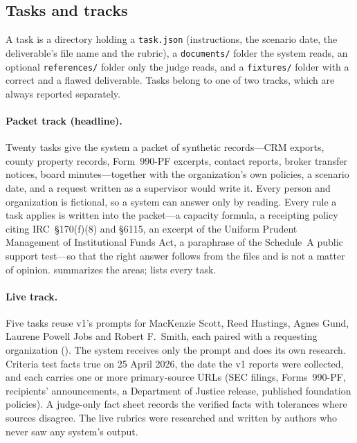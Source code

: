 \documentclass[11pt,a4paper]{article}
\begin{document}
\subsection{Tasks and tracks}

A task is a directory holding a \texttt{task.json} (instructions, the scenario date, the deliverable's file name and the rubric), a \texttt{documents/} folder the system reads, an optional \texttt{references/} folder only the judge reads, and a \texttt{fixtures/} folder with a correct and a flawed deliverable. Tasks belong to one of two tracks, which are always reported separately.

\paragraph{Packet track (headline).} Twenty tasks give the system a packet of synthetic records---CRM exports, county property records, Form~990-PF excerpts, contact reports, broker transfer notices, board minutes---together with the organization's own policies, a scenario date, and a request written as a supervisor would write it. Every person and organization is fictional, so a system can answer only by reading. Every rule a task applies is written into the packet---a capacity formula, a receipting policy citing IRC~\S170(f)(8) and \S6115, an excerpt of the Uniform Prudent Management of Institutional Funds Act, a paraphrase of the Schedule~A public support test---so that the right answer follows from the files and is not a matter of opinion.  summarizes the areas;  lists every task.

\paragraph{Live track.} Five tasks reuse v1's prompts for MacKenzie Scott, Reed Hastings, Agnes Gund, Laurene Powell Jobs and Robert F.~Smith, each paired with a requesting organization (). The system receives only the prompt and does its own research. Criteria test facts true on 25 April 2026, the date the v1 reports were collected, and each carries one or more primary-source URLs (SEC filings, Forms~990-PF, recipients' announcements, a Department of Justice release, published foundation policies). A judge-only fact sheet records the verified facts with tolerances where sources disagree. The live rubrics were researched and written by authors who never saw any system's output.
\end{document}
